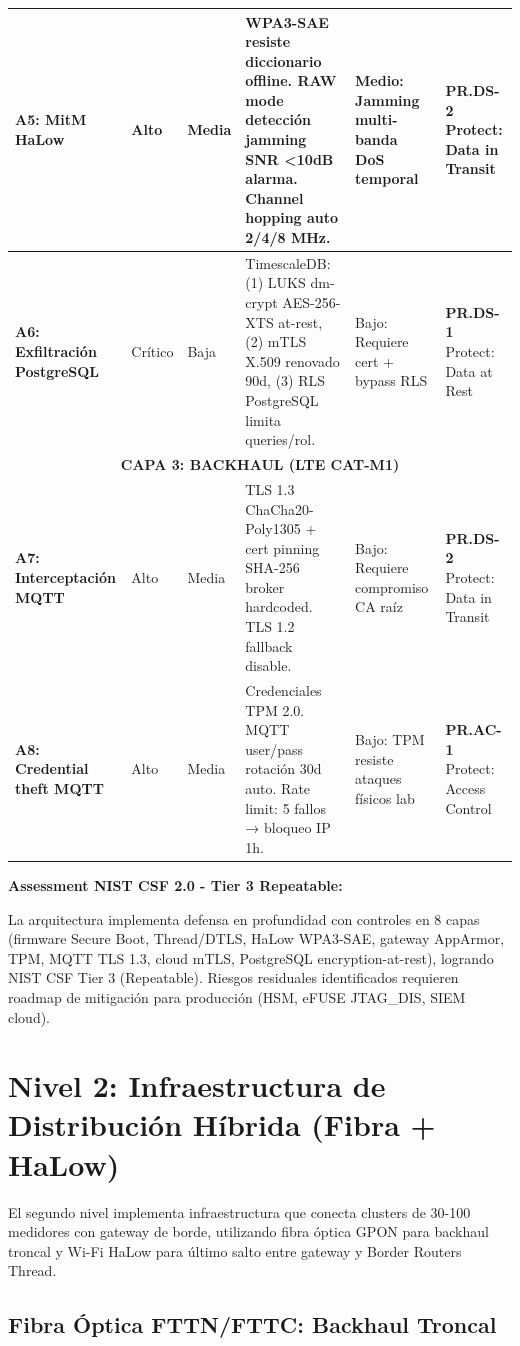 \begin{table}[h]
{\begin{tabular}{|p{3cm}|p{1.5cm}|p{1.5cm}|p{5cm}|p{2.5cm}|p{2cm}|}
\hline
\textbf{A5: MitM HaLow} & Alto & Media & WPA3-SAE resiste diccionario offline. RAW mode detección jamming SNR <10dB alarma. Channel hopping auto 2/4/8 MHz. & Medio: Jamming multi-banda DoS temporal & \textbf{PR.DS-2} Protect: Data in Transit \\
\hline
\textbf{A6: Exfiltración PostgreSQL} & Crítico & Baja & TimescaleDB: (1) LUKS dm-crypt AES-256-XTS at-rest, (2) mTLS X.509 renovado 90d, (3) RLS PostgreSQL limita queries/rol. & Bajo: Requiere cert + bypass RLS & \textbf{PR.DS-1} Protect: Data at Rest \\
\hline
\multicolumn{6}{|c|}{\cellcolor{orange!20}\textbf{CAPA 3: BACKHAUL (LTE CAT-M1)}} \\
\hline
\textbf{A7: Interceptación MQTT} & Alto & Media & TLS 1.3 ChaCha20-Poly1305 + cert pinning SHA-256 broker hardcoded. TLS 1.2 fallback disable. & Bajo: Requiere compromiso CA raíz & \textbf{PR.DS-2} Protect: Data in Transit \\
\hline
\textbf{A8: Credential theft MQTT} & Alto & Media & Credenciales TPM 2.0. MQTT user/pass rotación 30d auto. Rate limit: 5 fallos → bloqueo IP 1h. & Bajo: TPM resiste ataques físicos lab & \textbf{PR.AC-1} Protect: Access Control \\
\hline
\end{tabular}%
}
\end{table}

\textbf{Assessment NIST CSF 2.0 - Tier 3 Repeatable:}

La arquitectura implementa defensa en profundidad con controles en 8 capas (firmware Secure Boot, Thread/DTLS, HaLow WPA3-SAE, gateway AppArmor, TPM, MQTT TLS 1.3, cloud mTLS, PostgreSQL encryption-at-rest), logrando NIST CSF Tier 3 (Repeatable). Riesgos residuales identificados requieren roadmap de mitigación para producción (HSM, eFUSE JTAG\_DIS, SIEM cloud).

\section{Nivel 2: Infraestructura de Distribución Híbrida (Fibra + HaLow)}

El segundo nivel implementa infraestructura que conecta clusters de 30-100 medidores con gateway de borde, utilizando fibra óptica GPON para backhaul troncal y Wi-Fi HaLow para último salto entre gateway y Border Routers Thread.

\subsection{Fibra Óptica FTTN/FTTC: Backhaul Troncal}

